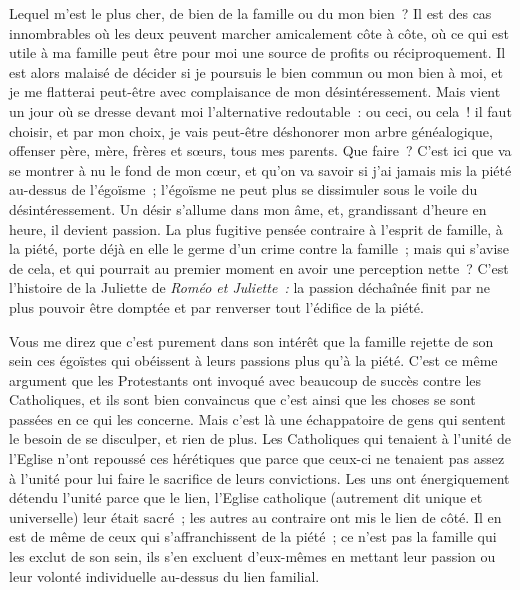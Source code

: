 \documentclass[french,twoside]{book} %
\begin{document}
Lequel m’est le plus cher, de bien de la famille ou du mon bien ? Il est des cas innombrables où les deux peuvent marcher amicalement côte à côte, où ce qui est utile à ma famille peut être pour moi une source de profits ou réciproquement. Il est alors malaisé de décider si je poursuis le bien commun ou mon bien à moi, et je me flatterai peut-être avec complaisance de mon désintéressement. Mais vient un jour où se dresse devant moi l’alternative redoutable : ou ceci, ou cela ! il faut choisir, et par mon choix, je vais peut-être déshonorer mon arbre généalogique, offenser père, mère, frères et sœurs, tous mes parents. Que faire ? C’est ici que va se montrer à nu le fond de mon cœur, et qu’on va savoir si j’ai jamais mis la piété au-dessus de l’égoïsme ; l’égoïsme ne peut plus se dissimuler sous le voile du désintéressement. Un désir s’allume dans mon âme, et, grandissant d’heure en heure, il devient passion. La plus fugitive pensée contraire à l’esprit de famille, à la piété, porte déjà en elle le germe d’un crime contre la famille ; mais qui s’avise de cela, et qui pourrait au premier moment en avoir une perception nette ? C’est l’histoire de la Juliette de \emph{Roméo et Juliette :} la passion déchaînée finit par  ne plus pouvoir être domptée et par renverser tout l’édifice de la piété.\par
Vous me direz que c’est purement dans son intérêt que la famille rejette de son sein ces égoïstes qui obéissent à leurs passions plus qu’à la piété. C’est ce même argument que les Protestants ont invoqué avec beaucoup de succès contre les Catholiques, et ils sont bien convaincus que c’est ainsi que les choses se sont passées en ce qui les concerne. Mais c’est là une échappatoire de gens qui sentent le besoin de se disculper, et rien de plus. Les Catholiques qui tenaient à l’unité de l’Eglise n’ont repoussé ces hérétiques que parce que ceux-ci ne tenaient pas assez à l’unité pour lui faire le sacrifice de leurs convictions. Les uns ont énergiquement détendu l’unité parce que le lien, l’Eglise catholique (autrement dit unique et universelle) leur était sacré ; les autres au contraire ont mis le lien de côté. Il en est de même de ceux qui s’affranchissent de la piété ; ce n’est pas la famille qui les exclut de son sein, ils s’en excluent d’eux-mêmes en mettant leur passion ou leur volonté individuelle au-dessus du lien familial.\par
\end{document}

